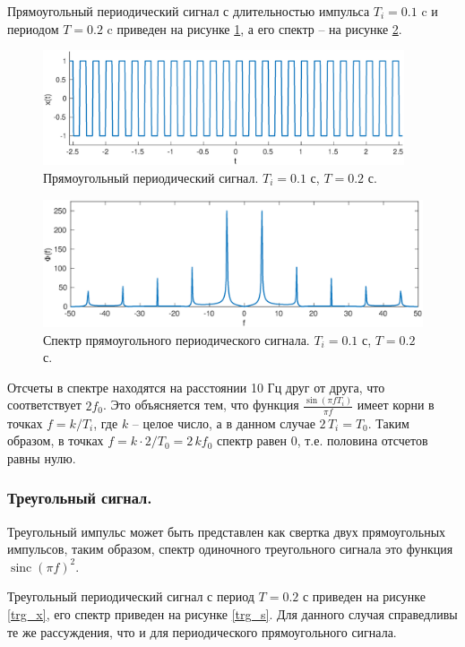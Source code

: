 \documentclass[a4paper,14pt]{extarticle}
\DeclareMathOperator{\sinc}{sinc}
\begin{document}
Прямоугольный периодический сигнал с длительностью импульса $T_i = 0.1$ c и периодом $T = 0.2$ c приведен на рисунке \ref{sqr_x}, а его спектр -- на рисунке \ref{sqr_s}. 

\begin{figure}[H]
\includegraphics[width=0.95\textwidth]{sqr_x.eps}
\captionsetup{justification=centering,margin=0cm}
\caption{Прямоугольный периодический сигнал. $T_i = 0.1$ с, $T = 0.2$ с.}
\label{sqr_x}
\end{figure}

\begin{figure}[H]
\includegraphics[width=1\textwidth]{sqr_s.eps}
\captionsetup{justification=centering,margin=1cm}
\caption{Спектр прямоугольного периодического сигнала. $T_i = 0.1$ с, $T = 0.2$ с. }
\label{sqr_s}
\end{figure}


Отсчеты в спектре находятся на расстоянии 10 Гц друг от друга, что соответствует $2f_0$. Это объясняется тем, что функция $\frac{\sin(\pi f T_i)}{\pi f}$ имеет корни в точках $f = k/T_i$, где $k$ -- целое число, а в данном случае $2\,T_i = T_0$. Таким образом, в точках $f = k \cdot 2/T_0 =  2 \, k f_0$ спектр равен 0, т.е. половина отсчетов равны нулю.

\subsubsection{Треугольный сигнал.}
Треугольный импульс может быть представлен как свертка двух прямоугольных импульсов, таким образом, спектр одиночного треугольного сигнала это функция $\sinc(\pi f)^2$.

Треугольный периодический сигнал с период $T = 0.2$ с приведен на рисунке \ref{trg_x}, его спектр приведен на рисунке \ref{trg_s}. Для данного случая справедливы те же рассуждения, что и для периодического прямоугольного сигнала.
\end{document}
